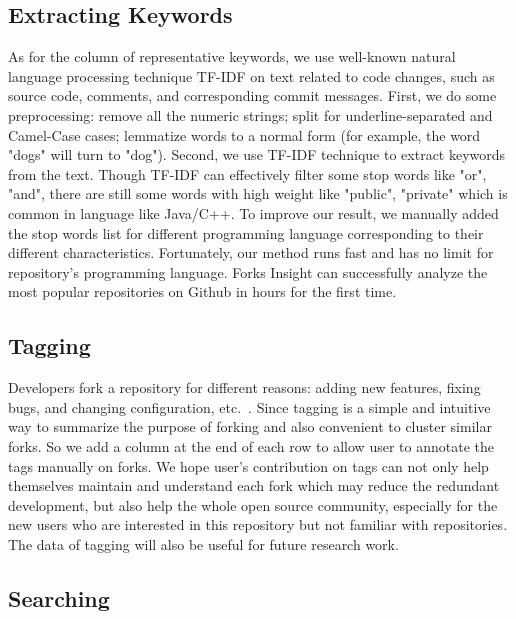 \subsection{Extracting Keywords}
As for the column of representative keywords, we use well-known natural language processing technique TF-IDF \cite{salton1988term} on text related to code changes, such as source code, comments, and corresponding commit messages. First, we do some preprocessing: remove all the numeric strings; split for underline-separated and Camel-Case cases; lemmatize words to a normal form (for example, the word "dogs" will turn to "dog"). Second, we use TF-IDF technique to extract keywords from the text. Though TF-IDF can effectively filter some stop words like "or", "and", there are still some words with high weight like "public", "private" which is common in language like Java/C++. To improve our result, we manually added the stop words list for different programming language corresponding to their different characteristics.
%
Fortunately, our method runs fast and has no limit for repository's programming language. Forks Insight can successfully analyze the most popular repositories on Github in hours for the first time.

\subsection{Tagging}
Developers fork a repository for different reasons: adding new features, fixing bugs, and changing configuration, etc.~\cite{Mikkonen2011,Robles2012,dubinsky2013exploratory,stanciulescu2015forked}.
%
Since tagging is a simple and intuitive way to summarize the purpose of forking and also convenient to cluster similar forks. So we add a column at the end of each row to allow user to annotate the tags manually on forks. We hope user's contribution on tags can not only help themselves maintain and understand each fork which may reduce the redundant development, but also help the whole open source community, especially for the new users who are interested in this repository but not familiar with repositories. The data of tagging will also be useful for future research work.


\subsection{Searching}

